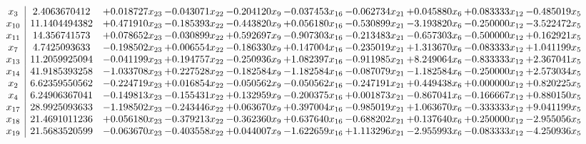 \documentclass[10pt]{article}
\begin{document}
 \[\begin{array}{c| c c@{\hskip 2pt} c@{\hskip 2pt} c@{\hskip 2pt} c@{\hskip 2pt} c@{\hskip 2pt} c@{\hskip 2pt} c@{\hskip 2pt} c@{\hskip 2pt} }
 x_{3}   &  2.4063670412 & + 0.018727 x_{23} & -0.043071 x_{22} & -0.204120 x_{9} & -0.037453 x_{16} & -0.062734 x_{21} & + 0.045880 x_{6} & + 0.083333 x_{12} & -0.485019 x_{5}\\
 x_{10}   &  11.1404494382 & + 0.471910 x_{23} & -0.185393 x_{22} & -0.443820 x_{9} & + 0.056180 x_{16} & -0.530899 x_{21} & -3.193820 x_{6} & -0.250000 x_{12} & -3.522472 x_{5}\\
 x_{11}   &  14.356741573 & + 0.078652 x_{23} & -0.030899 x_{22} & + 0.592697 x_{9} & -0.907303 x_{16} & -0.213483 x_{21} & -0.657303 x_{6} & -0.500000 x_{12} & + 0.162921 x_{5}\\
 x_{7}   &  4.7425093633 & -0.198502 x_{23} & + 0.006554 x_{22} & -0.186330 x_{9} & + 0.147004 x_{16} & -0.235019 x_{21} & + 1.313670 x_{6} & -0.083333 x_{12} & + 1.041199 x_{5}\\
 x_{13}   &  11.2059925094 & -0.041199 x_{23} & + 0.194757 x_{22} & -0.250936 x_{9} & + 1.082397 x_{16} & -0.911985 x_{21} & + 8.249064 x_{6} & -0.833333 x_{12} & + 2.367041 x_{5}\\
 x_{14}   &  41.9185393258 & -1.033708 x_{23} & + 0.227528 x_{22} & -0.182584 x_{9} & -1.182584 x_{16} & -0.087079 x_{21} & -1.182584 x_{6} & -0.250000 x_{12} & + 2.573034 x_{5}\\
 x_{2}   &  6.62359550562 & -0.224719 x_{23} & + 0.016854 x_{22} & -0.050562 x_{9} & -0.050562 x_{16} & -0.247191 x_{21} & + 0.449438 x_{6} & + 0.000000 x_{12} & + 0.820225 x_{5}\\
 x_{4}   &  6.24906367041 & -0.149813 x_{23} & -0.155431 x_{22} & + 0.132959 x_{9} & -0.200375 x_{16} & + 0.001873 x_{21} & -0.867041 x_{6} & -0.166667 x_{12} & + 0.880150 x_{5}\\
 x_{17}   &  28.9925093633 & -1.198502 x_{23} & -0.243446 x_{22} & + 0.063670 x_{9} & + 0.397004 x_{16} & -0.985019 x_{21} & + 1.063670 x_{6} & -0.333333 x_{12} & + 9.041199 x_{5}\\
 x_{18}   &  21.4691011236 & + 0.056180 x_{23} & -0.379213 x_{22} & -0.362360 x_{9} & + 0.637640 x_{16} & -0.688202 x_{21} & + 0.137640 x_{6} & + 0.250000 x_{12} & -2.955056 x_{5}\\
 x_{19}   &  21.5683520599 & -0.063670 x_{23} & -0.403558 x_{22} & + 0.044007 x_{9} & -1.622659 x_{16} & + 1.113296 x_{21} & -2.955993 x_{6} & -0.083333 x_{12} & -4.250936 x_{5}\\

\end{array}\]
\end{document}
